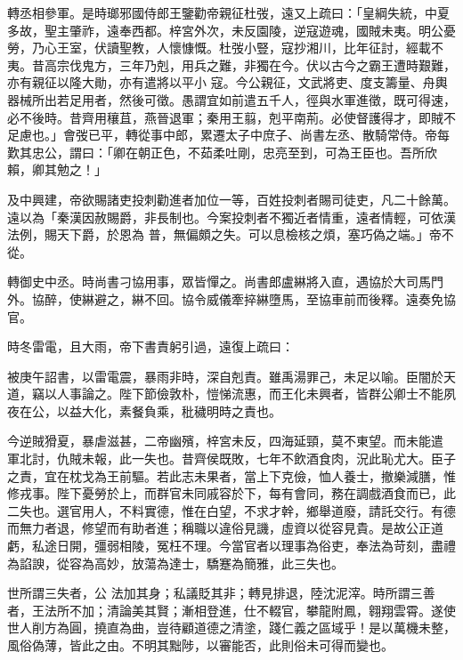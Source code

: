 \begin{pinyinscope}
 轉丞相參軍。是時瑯邪國侍郎王鑒勸帝親征杜弢，遠又上疏曰：「皇綱失統，中夏多故，聖主肇祚，遠奉西都。梓宮外次，未反園陵，逆寇遊魂，國賊未夷。明公憂勞，乃心王室，伏讀聖教，人懷慷慨。杜弢小豎，寇抄湘川，比年征討，經載不夷。昔高宗伐鬼方，三年乃剋，用兵之難，非獨在今。伏以古今之霸王遭時艱難，亦有親征以隆大勛，亦有遣將以平小
 寇。今公親征，文武將吏、度支籌量、舟輿器械所出若足用者，然後可徵。愚謂宜如前遣五千人，徑與水軍進徵，既可得速，必不後時。昔齊用穰苴，燕晉退軍；秦用王翦，剋平南荊。必使督護得才，即賊不足慮也。」會弢已平，轉從事中郎，累遷太子中庶子、尚書左丞、散騎常侍。帝每歎其忠公，謂曰：「卿在朝正色，不茹柔吐剛，忠亮至到，可為王臣也。吾所欣賴，卿其勉之！」



 及中興建，帝欲賜諸吏投刺勸進者加位一等，百姓投刺者賜司徒吏，凡二十餘萬。遠以為「秦漢因赦賜爵，非長制也。今案投刺者不獨近者情重，遠者情輕，可依漢法例，賜天下爵，於恩為
 普，無偏頗之失。可以息檢核之煩，塞巧偽之端。」帝不從。



 轉御史中丞。時尚書刁協用事，眾皆憚之。尚書郎盧綝將入直，遇協於大司馬門外。協醉，使綝避之，綝不回。協令威儀牽捽綝墮馬，至協車前而後釋。遠奏免協官。



 時冬雷電，且大雨，帝下書責躬引過，遠復上疏曰：



 被庚午詔書，以雷電震，暴雨非時，深自剋責。雖禹湯罪己，未足以喻。臣闇於天道，竊以人事論之。陛下節儉敦朴，愷悌流惠，而王化未興者，皆群公卿士不能夙夜在公，以益大化，素餐負乘，秕穢明時之責也。



 今逆賊猾夏，暴虐滋甚，二帝幽殯，梓宮未反，四海延頸，莫不東望。而未能遣
 軍北討，仇賊未報，此一失也。昔齊侯既敗，七年不飲酒食肉，況此恥尤大。臣子之責，宜在枕戈為王前驅。若此志未果者，當上下克儉，恤人養士，撤樂減膳，惟修戎事。陛下憂勞於上，而群官未同戚容於下，每有會同，務在調戲酒食而已，此二失也。選官用人，不料實德，惟在白望，不求才幹，鄉舉道廢，請託交行。有德而無力者退，修望而有助者進；稱職以違俗見譏，虛資以從容見貴。是故公正道虧，私途日開，彊弱相陵，冤枉不理。今當官者以理事為俗吏，奉法為苛刻，盡禮為諂諛，從容為高妙，放蕩為達士，驕蹇為簡雅，此三失也。



 世所謂三失者，公
 法加其身；私議貶其非；轉見排退，陸沈泥滓。時所謂三善者，王法所不加；清論美其賢；漸相登進，仕不輟官，攀龍附鳳，翱翔雲霄。遂使世人削方為圓，撓直為曲，豈待顧道德之清塗，踐仁義之區域乎！是以萬機未整，風俗偽薄，皆此之由。不明其黜陟，以審能否，此則俗未可得而變也。




\end{pinyinscope}
